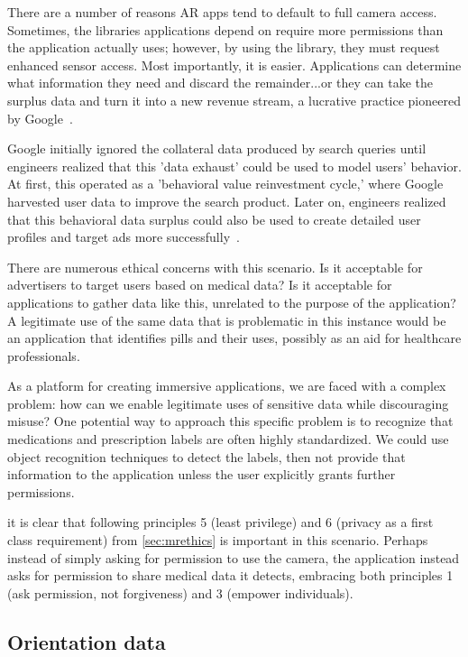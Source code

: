 There are a number of reasons AR apps tend to default to full camera access. Sometimes, the libraries applications depend on require more permissions than the application actually uses; however, by using the library, they must request enhanced sensor access. Most importantly, it is easier. Applications can determine what information they need and discard the remainder...or they can take the surplus data and turn it into a new revenue stream, a lucrative practice pioneered by Google~\cite{zuboff2019age}.

Google initially ignored the collateral data produced by search queries until engineers realized that this 'data exhaust' could be used to model users' behavior. At first, this operated as a 'behavioral value reinvestment cycle,' where Google harvested user data to improve the search product. Later on, engineers realized that this behavioral data surplus could also be used to create detailed user profiles and target ads more successfully~\cite{patent2003targetedad}.

There are numerous ethical concerns with this scenario. Is it acceptable for advertisers to target users based on medical data? Is it acceptable for applications to gather data like this, unrelated to the purpose of the application?  A legitimate use of the same data that is problematic in this instance would be an application that identifies pills and their uses, possibly as an aid for healthcare professionals.

As a platform for creating immersive applications, we are faced with a complex problem: how can we enable legitimate uses of sensitive data while discouraging misuse? One potential way to approach this specific problem is to recognize that medications and prescription labels are often highly standardized. We could use object recognition techniques to detect the labels, then not provide that information to the application unless the user explicitly grants further permissions.

it is clear that following principles 5 (least privilege) and 6 (privacy as a first class requirement) from \autoref{sec:mrethics} is important in this scenario. Perhaps instead of simply asking for permission to use the camera, the application instead asks for permission to share medical data it detects, embracing both principles 1 (ask permission, not forgiveness) and 3 (empower individuals).

\subsection{Orientation data}

